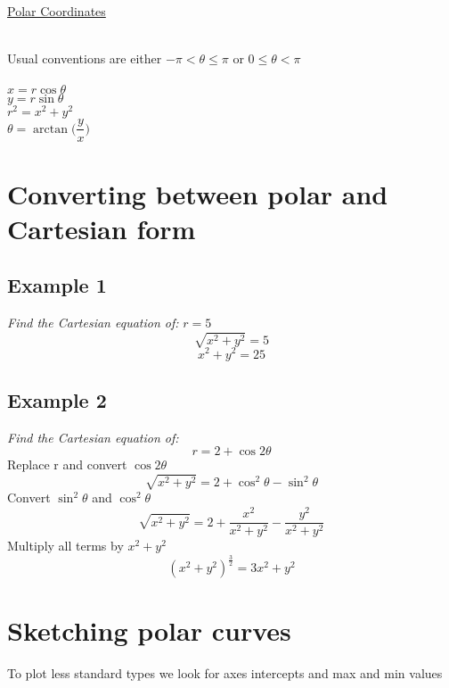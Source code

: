 \documentclass{article}
\begin{document}
\begin{center}
\underline{\huge Polar Coordinates}
\end{center}
\\
Usual conventions are either $-\pi<\theta\leqslant\pi$ or $0\leqslant\theta<\pi$\\
\\
$x=r\cos\theta$\\
$y=r\sin\theta$\\
$r^2=x^2+y^2$\\
$\theta=\arctan\Big(\dfrac{y}{x}\Big)$
\section{Converting between polar and Cartesian form}
\subsection{Example 1}
\textit{Find the Cartesian equation of:}
$r=5$
$$\sqrt{x^2+y^2}=5$$
$$x^2+y^2=25$$
\subsection{Example 2}
\textit{Find the Cartesian equation of:}
$$r=2+\cos2\theta$$
Replace r and convert $\cos2\theta$
$$\sqrt{x^2+y^2}=2+\cos^2\theta-\sin^2\theta$$
Convert $\sin^2\theta$ and $\cos^2\theta$
$$\sqrt{x^2+y^2}=2+\frac{x^2}{x^2+y^2}-\frac{y^2}{x^2+y^2}$$
Multiply all terms by $x^2+y^2$
$$(x^2+y^2)^{\frac{3}{2}}=3x^2+y^2$$
\newpage
\section{Sketching polar curves}
To plot less standard types we look for axes intercepts and max and min values
\end{document}
